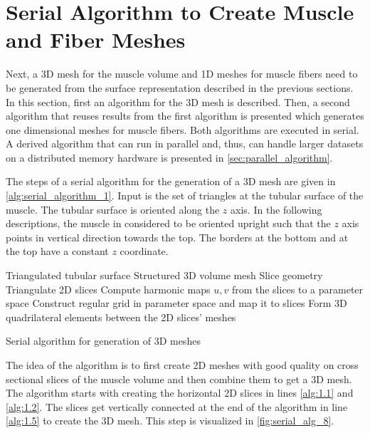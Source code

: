 \section{Serial Algorithm to Create Muscle and Fiber Meshes}\label{sec:ser_alg_meshes}
Next, a 3D mesh for the muscle volume and 1D meshes for muscle fibers need to be generated from the surface representation described in the previous sections. In this section, first an algorithm for the 3D mesh is described. Then, a second algorithm that reuses results from the first algorithm is presented which generates one dimensional meshes for muscle fibers. Both algorithms are executed in serial. A derived algorithm that can run in parallel and, thus, can handle larger datasets on a distributed memory hardware is presented in \cref{sec:parallel_algorithm}.

The steps of a serial algorithm for the generation of a 3D mesh are given in \cref{alg:serial_algorithm_1}. Input is the set of triangles at the tubular surface of the muscle. The tubular surface is oriented along the $z$ axis. In the following descriptions, the muscle in considered to be oriented upright such that the $z$ axis points in vertical direction towards the top. The borders at the bottom and at the top have a constant $z$ coordinate.
%
\begin{algorithm}
  \begin{algorithmic}[1]%
    \Require Triangulated tubular surface
    \Ensure Structured 3D volume mesh
    \Statex
    \State Slice geometry           \label{alg:1.1}
    \State Triangulate 2D slices      \label{alg:1.2}
    \State Compute harmonic maps $u, v$ from the slices to a parameter space     \label{alg:1.3}
    \State Construct regular grid in parameter space and map it to slices            \label{alg:1.4}
    \State Form 3D quadrilateral elements between the 2D slices’ meshes   \label{alg:1.5}
    \EndProcedure
  \end{algorithmic}%
  \caption{Serial algorithm for generation of 3D meshes}%
  \label{alg:serial_algorithm_1}%
\end{algorithm}%

The idea of the algorithm is to first create 2D meshes with good quality on cross sectional slices of the muscle volume and then combine them to get a 3D mesh. The algorithm starts with creating the horizontal 2D slices in lines \ref{alg:1.1} and \ref{alg:1.2}. The slices get vertically connected at the end of the algorithm in line \ref{alg:1.5} to create the 3D mesh. This step is visualized in \cref{fig:serial_alg_8}. 

